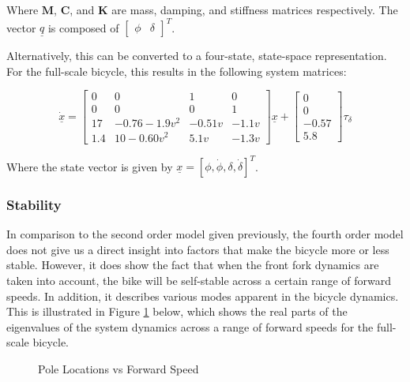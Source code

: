 Where $\mathbf{M}$, $\mathbf{C}$, and $\mathbf{K}$ are mass, damping, and stiffness matrices respectively. The vector $\underline{q}$ is composed of $\begin{bmatrix} \phi & \delta \end{bmatrix}^T$.

Alternatively, this can be converted to a four-state, state-space representation. For the full-scale bicycle, this results in the following system matrices:

\begin{equation*}
\underline{\dot{x}} = 
\begin{bmatrix}
0 & 0 & 1 & 0 \\
0 & 0 & 0 & 1 \\
17 & -0.76 - 1.9v^2 & -0.51v & -1.1v \\
1.4 & 10-0.60v^2 & 5.1v & -1.3v
\end{bmatrix} \underline{x} + \begin{bmatrix}
0 \\
0 \\
-0.57 \\
5.8
\end{bmatrix} \tau_{\delta}
\end{equation*}

Where the state vector is given by $\underline{x} = [\phi, \dot{\phi}, \delta, \dot{\delta}]^T$.

\subsubsection{Stability}
In comparison to the second order model given previously, the fourth order model does not give us a direct insight into factors that make the bicycle more or less stable. However, it does show the fact that when the front fork dynamics are taken into account, the bike will be self-stable across a certain range of forward speeds. In addition, it describes various modes apparent in the bicycle dynamics. This is illustrated in Figure \ref{fig:PoleVsSpeed} below, which shows the real parts of the eigenvalues of the system dynamics across a range of forward speeds for the full-scale bicycle.

\begin{figure}[H]
	\centering
	\caption{Pole Locations vs Forward Speed}
	\label{fig:PoleVsSpeed}
\end{figure}

